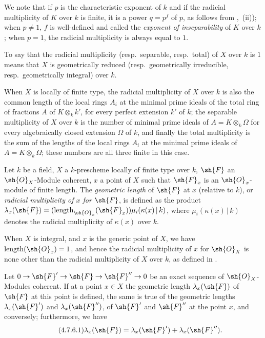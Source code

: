 We note that if $p$ is the characteristic exponent of $k$ and if the radicial multiplicity of $K$ over $k$ is finite, it is a power $q=p^f$ of $p$, as follows from ,~(ii)); when $p\neq 1$, $f$ is well-defined and called the \emph{exponent of inseparability} of $K$ over $k$; when $p=1$, the radicial multiplicity is always equal to $1$.

To say that the radicial multiplicity (resp.\ separable, resp.\ total) of $X$ over $k$ is $1$ means that $X$ is geometrically reduced (resp.\ geometrically irreducible, resp.\ geometrically integral) over $k$.

When $X$ is locally of finite type, the radicial multiplicity of $X$ over $k$ is also the common length of the local rings $A_i$ at the minimal prime ideals of the total ring of fractions $A$ of $K\otimes_k k'$, for every perfect extension $k'$ of $k$; the separable multiplicity of $X$ over $k$ is the number of minimal prime ideals of $A=K\otimes_k\Omega$ for every algebraically closed extension $\Omega$ of $k$, and finally the total multiplicity is the sum of the lengths of the local rings $A_i$ at the minimal prime ideals of $A=K\otimes_k\Omega$; these numbers are all three finite in this case.

\begin{definition}[4.7.5]
\label{IV.4.7.5}
Let $k$ be a field, $X$ a $k$-prescheme locally of finite type over $k$, $\sh{F}$ an $\sh{O}_X$-Module coherent, $x$ a point of $X$ such that $\sh{F}_x$ is an $\sh{O}_x$-module of finite length.
The \emph{geometric length} of $\sh{F}$ at $x$ (relative to $k$), or \emph{radicial multiplicity of $x$ for} $\sh{F}$, is defined as the product $\lambda_x(\sh{F}) = (\operatorname{length}_{\sh{O}_x}(\sh{F}_x))\mu_i(\kappa(x)\,|\,k)$, where $\mu_i(\kappa(x)\,|\,k)$ denotes the radicial multiplicity of $\kappa(x)$ over $k$.
\end{definition}

When $X$ is integral, and $x$ is the generic point of $X$, we have $\operatorname{length}(\sh{O}_x)=1$, and hence the radicial multiplicity of $x$ for $\sh{O}_X$ is none other than the radicial multiplicity of $X$ over $k$, as defined in .


\begin{proposition}[4.7.6]
\label{IV.4.7.6}
Let $0\to\sh{F}'\to\sh{F}\to\sh{F}''\to 0$ be an exact sequence of $\sh{O}_X$-Modules coherent.
If at a point $x\in X$ the geometric length $\lambda_x(\sh{F})$ of $\sh{F}$ at this point is defined, the same is true of the geometric lengths $\lambda_x(\sh{F}')$ and $\lambda_x(\sh{F}'')$, of $\sh{F}'$ and $\sh{F}''$ at the point $x$, and conversely; furthermore, we have
\[
\tag{4.7.6.1}
  \lambda_x(\sh{F}) = \lambda_x(\sh{F}') + \lambda_x(\sh{F}'').
\]
\end{proposition}

